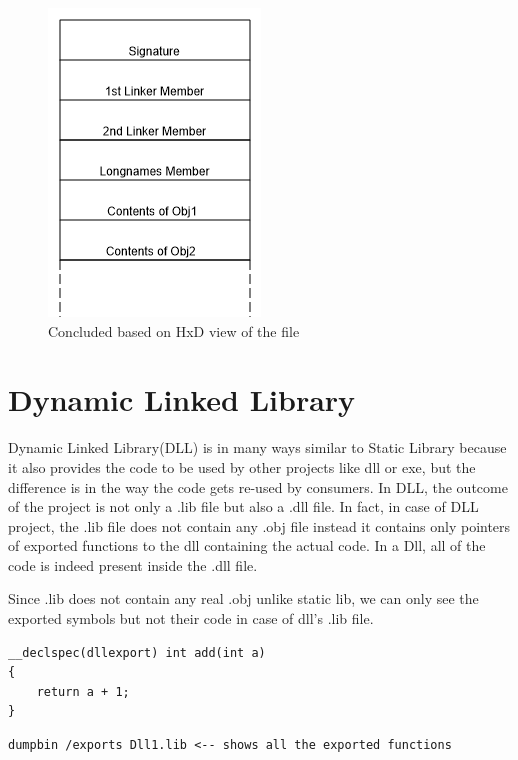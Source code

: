 \documentclass{article}
\begin{document}
\begin{figure}[H]
\centering
\includegraphics{2.StructureStaticLib.png}
\caption{Concluded based on HxD view of the file}
\end{figure}

\section{Dynamic Linked Library}
Dynamic Linked Library(DLL) is in many ways similar to Static Library because
it also provides the code to be used by other projects like dll or exe,
but the difference is in the way the code gets re-used by consumers.
In DLL, the outcome of the project is not only a .lib file but also a
.dll file. In fact, in case of DLL project, the .lib file does not contain
any .obj file instead it contains only pointers of exported functions to
the dll containing the actual code. In a Dll, all of the code is indeed
present inside the .dll file.

Since .lib does not contain any real .obj unlike static lib, we can
only see the exported symbols but not their code in case of dll's .lib file.

\begin{verbatim}
__declspec(dllexport) int add(int a)
{
    return a + 1;
}
\end{verbatim}

\begin{verbatim}
dumpbin /exports Dll1.lib <-- shows all the exported functions
\end{verbatim}
\end{document}
